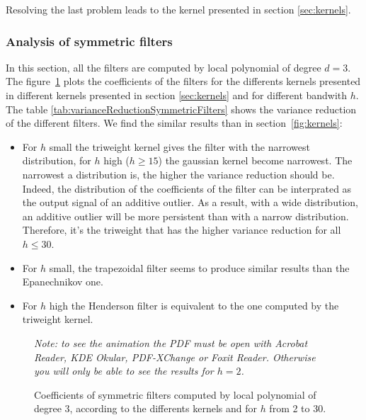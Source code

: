 \documentclass[
  12pt,
  ,
  a4paper]{article}
\newcommand\1{\mathds{1}}
\begin{document}
Resolving the last problem leads to the kernel presented in section \ref{sec:kernels}.

\hypertarget{analysis-of-symmetric-filters}{%
\subsubsection{Analysis of symmetric filters}\label{analysis-of-symmetric-filters}}

In this section, all the filters are computed by local polynomial of degree \(d=3\).
The figure~\ref{fig:filterscoefs} plots the coefficients of the filters for the differents kernels presented in different kernels presented in section \ref{sec:kernels} and for different bandwith \(h\).
The table \ref{tab:varianceReductionSymmetricFilters} shows the variance reduction of the different filters.
We find the similar results than in section~\ref{fig:kernels}:

\begin{itemize}
\item
  For \(h\) small the triweight kernel gives the filter with the narrowest distribution, for \(h\) high (\(h\geq15\)) the gaussian kernel become narrowest.
  The narrowest a distribution is, the higher the variance reduction should be.
  Indeed, the distribution of the coefficients of the filter can be interprated as the output signal of an additive outlier.
  As a result, with a wide distribution, an additive outlier will be more persistent than with a narrow distribution.
  Therefore, it's the triweight that has the higher variance reduction for all \(h\leq30\).
\item
  For \(h\) small, the trapezoidal filter seems to produce similar results than the Epanechnikov one.
\item
  For \(h\) high the Henderson filter is equivalent to the one computed by the triweight kernel.
\end{itemize}

\begin{figure}[!ht]
\caption{Coefficients of symmetric filters computed by local polynomial of degree $3$, according to the differents kernels and for $h$ from 2 to 30.}\label{fig:filterscoefs}\footnotesize
\emph{Note: to see the animation the PDF must be open with Acrobat Reader, KDE Okular, PDF-XChange or Foxit Reader.
Otherwise you will only be able to see the results for $h=2$.}
\end{figure}
\end{document}
